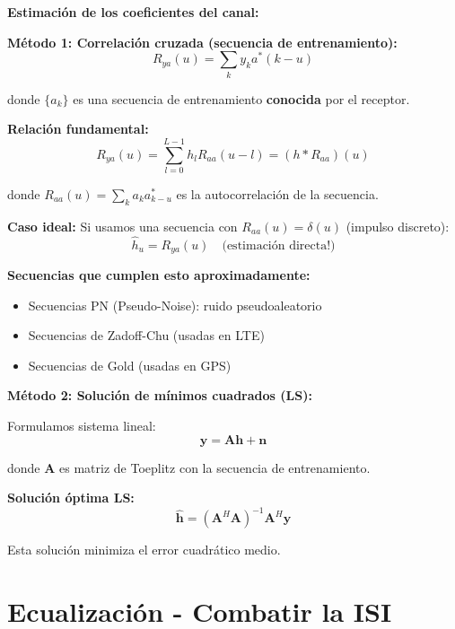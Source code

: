 \documentclass[10pt,a4paper]{article}
\begin{document}
\textbf{Estimación de los coeficientes del canal:}

\textbf{Método 1: Correlación cruzada (secuencia de entrenamiento):}
$$R_{ya}(u) = \sum_k y_k a^*(k-u)$$

donde $\{a_k\}$ es una secuencia de entrenamiento \textbf{conocida} por el receptor.

\textbf{Relación fundamental:}
$$\boxed{R_{ya}(u) = \sum_{l=0}^{L-1} h_l R_{aa}(u-l) = (h * R_{aa})(u)}$$

donde $R_{aa}(u) = \sum_k a_k a^*_{k-u}$ es la autocorrelación de la secuencia.

\textbf{Caso ideal:} Si usamos una secuencia con $R_{aa}(u) = \delta(u)$ (impulso discreto):
$$\boxed{\hat{h}_u = R_{ya}(u) \quad \text{(estimación directa!)}}$$

\textbf{Secuencias que cumplen esto aproximadamente:}
\begin{itemize}
\item Secuencias PN (Pseudo-Noise): ruido pseudoaleatorio
\item Secuencias de Zadoff-Chu (usadas en LTE)
\item Secuencias de Gold (usadas en GPS)
\end{itemize}

\textbf{Método 2: Solución de mínimos cuadrados (LS):}

Formulamos sistema lineal:
$$\mathbf{y} = \mathbf{A}\mathbf{h} + \mathbf{n}$$

donde $\mathbf{A}$ es matriz de Toeplitz con la secuencia de entrenamiento.

\textbf{Solución óptima LS:}
$$\boxed{\hat{\mathbf{h}} = (\mathbf{A}^H \mathbf{A})^{-1} \mathbf{A}^H \mathbf{y}}$$

Esta solución minimiza el error cuadrático medio.

\section{Ecualización - Combatir la ISI}
\end{document}
